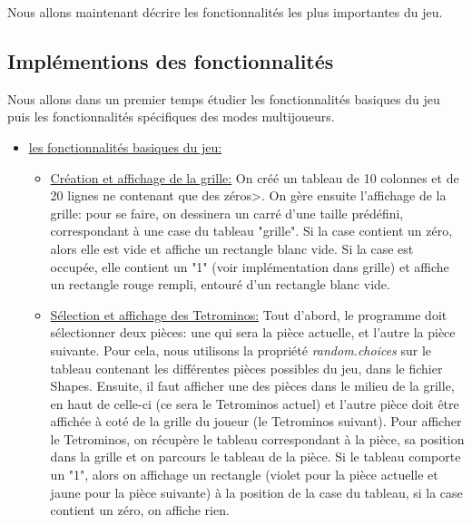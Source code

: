 \documentclass[a4paper, 11pt]{article}
\begin{document}
            Nous allons maintenant décrire les fonctionnalités les plus importantes du jeu.
        \subsection{Implémentions des fonctionnalités}
        	Nous allons dans un premier temps étudier les fonctionnalités basiques du jeu puis les fonctionnalités spécifiques des	modes multijoueurs.
        	
        	\begin{itemize}
            	\item \underline{les fonctionnalités basiques du jeu:}
            	\newline
            	\begin{itemize}
            		\item \underline{Création et affichage de la grille:}%
            		On créé un tableau de 10 colonnes et de 20 lignes ne contenant que des zéros>. On gère ensuite l'affichage de la grille: pour se faire, on dessinera un carré d'une taille prédéfini, correspondant à une case du tableau "grille". Si la case contient un zéro, alors elle est vide et affiche un rectangle blanc vide.
            		Si la case est occupée, elle contient un "1" (voir implémentation dans grille) et affiche un rectangle rouge rempli, entouré d'un rectangle blanc vide.
            		\newline
            		\item \underline {Sélection et affichage des Tetrominos:}%
            		Tout d'abord, le programme doit sélectionner deux pièces: une qui sera la pièce actuelle, et l'autre la pièce suivante. Pour cela, nous utilisons la propriété \textit{random.choices} sur le tableau contenant les différentes	pièces possibles du jeu, dans le fichier Shapes. Ensuite, il faut afficher une des pièces dans le milieu de la grille, en haut de celle-ci (ce sera le Tetrominos actuel) et l'autre pièce doit être affichée à coté de la grille du joueur (le Tetrominos suivant). Pour afficher le Tetrominos, on
            		récupère le tableau correspondant à la pièce, sa position dans la grille et on parcours le tableau de la pièce. Si le tableau comporte un "1", alors on affichage un rectangle (violet pour la pièce actuelle et jaune pour la pièce suivante) à la position de la case du tableau, si la case contient un	zéro, on affiche rien.
            		\newline
            		

\end{itemize}
\end{itemize}
\end{document}
